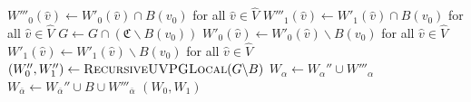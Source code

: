 \begin{algorithm}
\begin{algorithmic}[1]
		\If{$\overline{\alpha} \in \Delta$}
		\State $W'''_0(\hat{v}) \gets W'_0(\hat{v}) \cap B(v_0)$ for all $\hat{v} \in \hat{V}$
		\State $W'''_1(\hat{v}) \gets W'_1(\hat{v}) \cap B(v_0)$ for all $\hat{v} \in \hat{V}$
		\State $G \gets G \cap (\mathfrak{C} \backslash B(v_0))$
		\State $W'_0(\hat{v}) \gets W'_0(\hat{v}) \backslash B(v_0)$ for all $\hat{v} \in \hat{V}$
		\State $W'_1(\hat{v}) \gets W'_1(\hat{v}) \backslash B(v_0)$ for all $\hat{v} \in \hat{V}$
		\EndIf
		\State $(W_0'', W_1'') \gets \textsc{RecursiveUVPGLocal}(G \backslash B)$
		\State $W_\alpha \gets W_\alpha'' \cup W'''_{\alpha}$
		\State $W_{\overline{\alpha}} \gets W_{\overline{\alpha}}'' \cup B \cup W'''_{\overline{\alpha}}$
		\EndIf
		\State \Return $(W_0, W_1)$
	\end{algorithmic}
\end{algorithm}